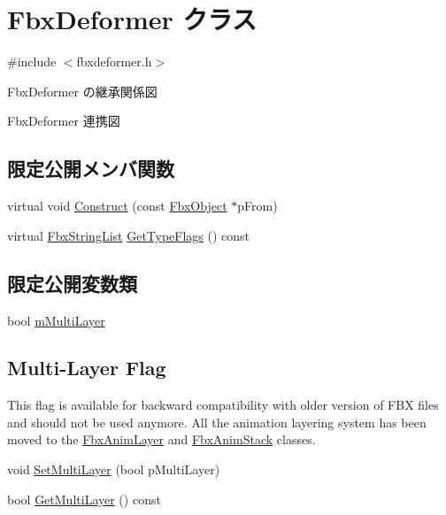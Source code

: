 \hypertarget{class_fbx_deformer}{}\section{Fbx\+Deformer クラス}
\label{class_fbx_deformer}


{\ttfamily \#include $<$fbxdeformer.\+h$>$}



Fbx\+Deformer の継承関係図


Fbx\+Deformer 連携図
\subsection*{限定公開メンバ関数}
\begin{DoxyCompactItemize}
\item 
virtual void \hyperlink{class_fbx_deformer_ac50e8e0e8cfd2934f8f8cca2d69a6f58}{Construct} (const \hyperlink{class_fbx_object}{Fbx\+Object} $\ast$p\+From)
\item 
virtual \hyperlink{class_fbx_string_list}{Fbx\+String\+List} \hyperlink{class_fbx_deformer_ac3f5a3eb2dda62397fc667004d798319}{Get\+Type\+Flags} () const
\end{DoxyCompactItemize}
\subsection*{限定公開変数類}
\begin{DoxyCompactItemize}
\item 
bool \hyperlink{class_fbx_deformer_ac570aba2e0282a6075831422a05c2d48}{m\+Multi\+Layer}
\end{DoxyCompactItemize}
\subsection*{Multi-\/\+Layer Flag}
\label{_amgrpdf4ac1e76a017b89c2c8620c9bd4ab91}%
This flag is available for backward compatibility with older version of F\+BX files and should not be used anymore. All the animation layering system has been moved to the \hyperlink{class_fbx_anim_layer}{Fbx\+Anim\+Layer} and \hyperlink{class_fbx_anim_stack}{Fbx\+Anim\+Stack} classes. \begin{DoxyCompactItemize}
\item 
void \hyperlink{class_fbx_deformer_ac1152e69487365faa19fe23ffde19f85}{Set\+Multi\+Layer} (bool p\+Multi\+Layer)
\item 
bool \hyperlink{class_fbx_deformer_a1f56fdb78d3b615bb2b4b4d142436e8b}{Get\+Multi\+Layer} () const
\end{DoxyCompactItemize}
